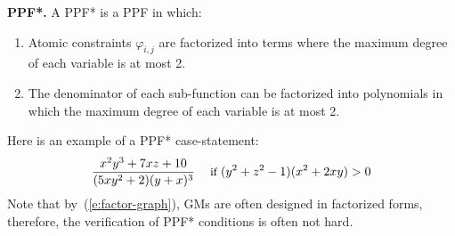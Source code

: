\documentclass[letterpaper]{article}
\renewcommand{\vec}[1]{\mathbf{#1}}
\newcommand{\singlecase}[2]{#2 \quad \text{ if } #1}
\begin{document}
\noindent\textbf{PPF*. }
A PPF* is a PPF in which: %
\vspace{-1mm}
\begin{enumerate}[leftmargin=2.6ex]
\item Atomic constraints {$\varphi_{i,j}$} are factorized into terms where the maximum degree of each variable is at most 2. 
\item The denominator of each sub-function can be factorized into %
polynomials in which the maximum degree of each variable is at most 2.
\end{enumerate}
\vspace{-1mm}
Here is an example of a PPF* case-statement:
{\footnotesize
\begin{equation}\vspace{-0.5mm}
{\footnotesize
\label{e:ppf*example}
\singlecase{(y^2+z^2 -1)(x^2+2xy) > 0}
{\frac{x^2 y^3 + 7xz + 10}{(5xy^2 + 2)(y + x)^3}}
}
\end{equation}
}
Note that by~(\ref{e:factor-graph}), GMs are often designed in factorized forms, therefore, the verification of PPF* conditions is often not hard. 
\end{document}
